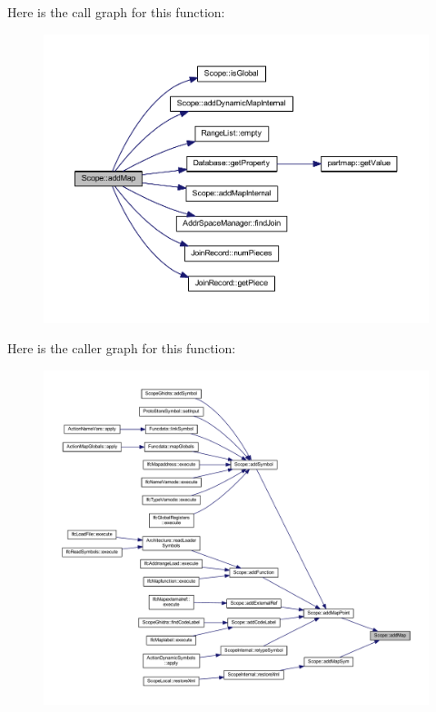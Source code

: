 Here is the call graph for this function\+:
\nopagebreak
\begin{figure}[H]
\begin{center}
\leavevmode
\includegraphics[width=350pt]{class_scope_ab93f6dfecb978ac52b56f967896ca758_cgraph}
\end{center}
\end{figure}
Here is the caller graph for this function\+:
\nopagebreak
\begin{figure}[H]
\begin{center}
\leavevmode
\includegraphics[width=350pt]{class_scope_ab93f6dfecb978ac52b56f967896ca758_icgraph}
\end{center}
\end{figure}
\mbox{\label{class_scope_aec0451f131ea214a174e00a434be36e9}} 
